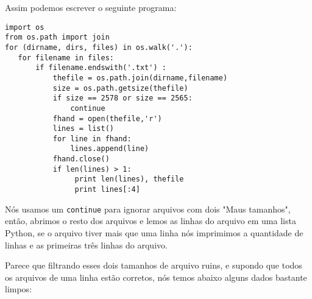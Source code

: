 Assim podemos escrever o seguinte programa:

\beforeverb
\begin{verbatim}
import os
from os.path import join
for (dirname, dirs, files) in os.walk('.'):
   for filename in files:
       if filename.endswith('.txt') :
           thefile = os.path.join(dirname,filename)
           size = os.path.getsize(thefile)
           if size == 2578 or size == 2565:
               continue
           fhand = open(thefile,'r')
           lines = list()
           for line in fhand:
               lines.append(line)
           fhand.close()
           if len(lines) > 1:
                print len(lines), thefile
                print lines[:4]
\end{verbatim}
\afterverb


Nós usamos um {\tt continue} para ignorar arquivos com dois "Maus tamanhos", então, abrimos o resto dos arquivos e lemos as linhas do arquivo em uma lista Python, se o arquivo tiver mais que uma linha nós imprimimos a quantidade de linhas e as primeiras três linhas do arquivo.

Parece que filtrando esses dois tamanhos de arquivo ruins, e supondo
que todos os arquivos de uma linha estão corretos, nós temos abaixo alguns dados bastante limpos:

